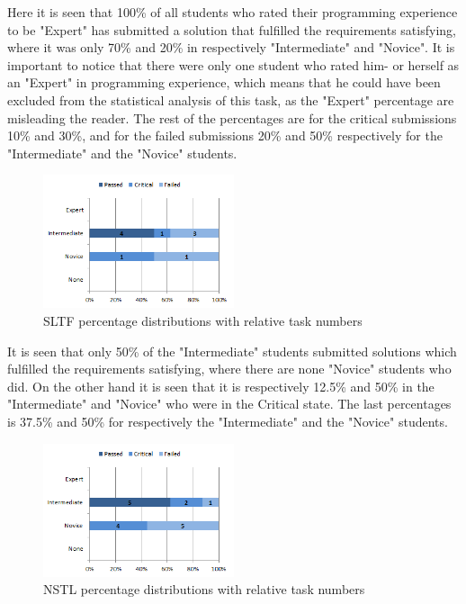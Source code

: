 \documentclass{sig-alternate-05-2015}
\begin{document}
Here it is seen that 100\% of all students who rated their programming experience to be "Expert" has submitted a solution that fulfilled the requirements satisfying, where it was only 70\% and 20\% in respectively "Intermediate" and "Novice".
It is important to notice that there were only one student who rated him- or herself as an "Expert" in programming experience, which means that he could have been excluded from the statistical analysis of this task, as the "Expert" percentage are misleading the reader. The rest of the percentages are for the critical submissions 10\% and 30\%, and for the failed submissions 20\% and 50\% respectively for the "Intermediate" and the "Novice" students.

\begin{figure}[H]
	\centering
	\includegraphics[width=0.5\textwidth]{img07}
	\caption{SLTF percentage distributions with relative task numbers}
\end{figure}

It is seen that only 50\% of the "Intermediate" students submitted solutions which fulfilled the requirements satisfying, where there are none "Novice" students who did. On the other hand it is seen that it is respectively 12.5\% and 50\% in the "Intermediate" and "Novice" who were in the Critical state. The last percentages is 37.5\% and 50\% for respectively the "Intermediate" and the "Novice" students.

\begin{figure}[H]
	\centering
	\includegraphics[width=0.5\textwidth]{img08}
	\caption{NSTL percentage distributions with relative task numbers}
\end{figure}
\end{document}

